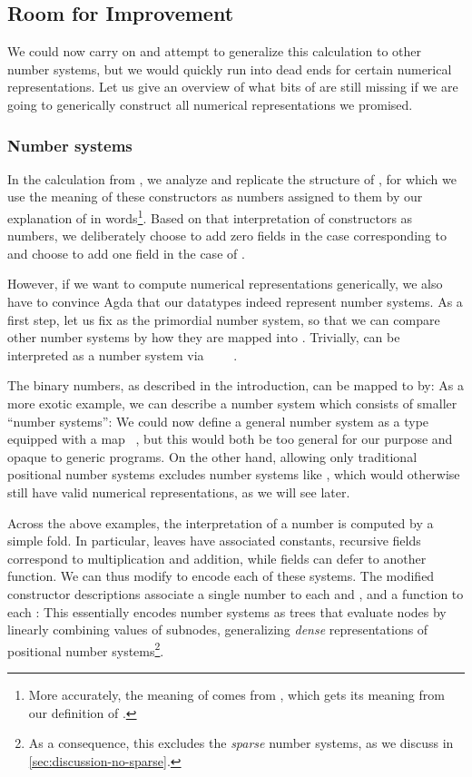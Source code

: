 \subsection{Room for Improvement}
We could now carry on and attempt to generalize this calculation to other number systems, but we would quickly run into dead ends for certain numerical representations. Let us give an overview of what bits of  are still missing if we are going to generically construct all numerical representations we promised.

\subsubsection{Number systems}\label{ssec:numbers}
In the calculation  from \bN{}, we analyze and replicate the structure of \bN{}, for which we use the meaning of these constructors as numbers assigned to them by our explanation of \bN{} in words\footnote{More accurately, the meaning of \bN{} comes from , which gets its meaning from our definition of \AF{\_<\_}.}. Based on that interpretation of constructors as numbers, we deliberately choose to add zero fields in the case corresponding to  and choose to add one field in the case of .

However, if we want to compute numerical representations generically, we also have to convince Agda that our datatypes indeed represent number systems. As a first step, let us fix \bN{} as the primordial number system, so that we can compare other number systems by how they are mapped into \bN{}. Trivially, \bN{} can be interpreted as a number system via \ \AV{:}\ \bN{}\ \ \bN{}.

The binary numbers, as described in the introduction, can be mapped to \bN{} by:
As a more exotic example, we can describe a number system
which consists of smaller ``number systems'':
We could now define a general number system as a type  equipped with a map \ \bN{}, but this would both be too general for our purpose and opaque to generic programs. On the other hand, allowing only traditional positional number systems excludes number systems like , which would otherwise still have valid numerical representations, as we will see later.

Across the above examples, the interpretation of a number is computed by a simple fold. In particular, leaves have associated constants, recursive fields correspond to multiplication and addition, while fields can defer to another function. We can thus modify  to encode each of these systems. The modified constructor descriptions  associate a single number to each  and , and a function to each :
This essentially encodes number systems as trees that evaluate nodes by linearly combining values of subnodes, generalizing \emph{dense} representations of positional number systems\footnote{As a consequence, this excludes the \emph{sparse} number systems, as we discuss in \autoref{sec:discussion-no-sparse}.}.

